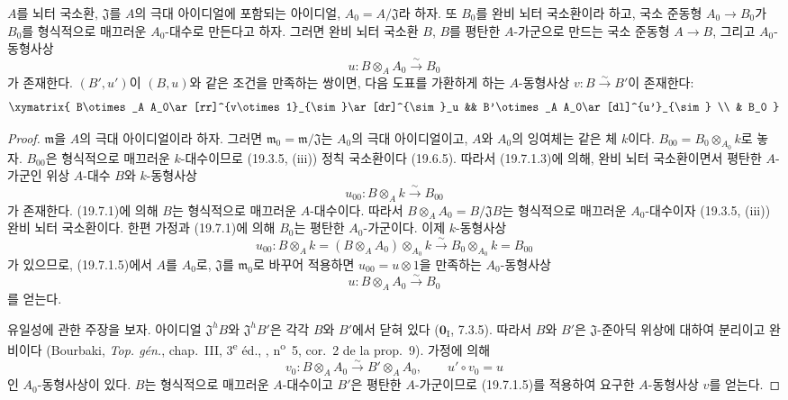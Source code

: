 \begin{theorem}[19.7.2]
\label{0.19.7.2-ko}
$A$를 뇌터 국소환, $\mathfrak J$를 $A$의 극대 아이디얼에 포함되는
아이디얼, $A_0=A/\mathfrak J$라 하자. 또 $B_0$를 완비 뇌터 국소환이라
하고, 국소 준동형 $A_0\to B_0$가 $B_0$를 형식적으로 매끄러운
$A_0$-대수로 만든다고 하자. 그러면 완비 뇌터 국소환 $B$, $B$를
평탄한 $A$-가군으로 만드는 국소 준동형 $A\to B$, 그리고
$A_0$-동형사상
\[
  u:B\otimes_A A_0\xrightarrow{\sim}B_0
\]
가 존재한다. $(B',u')$이 $(B,u)$와 같은 조건을 만족하는 쌍이면,
다음 도표를 가환하게 하는 $A$-동형사상
$v:B\xrightarrow{\sim}B'$이 존재한다:
\[
\xymatrix{
  B\otimes_A A_0\ar[rr]^{v\otimes1}_{\sim}\ar[dr]^{\sim}_u &&
  B'\otimes_A A_0\ar[dl]^{u'}_{\sim} \\
  & B_0
}
\]
\end{theorem}


\begin{proof}
$\mathfrak m$을 $A$의 극대 아이디얼이라 하자. 그러면
$\mathfrak m_0=\mathfrak m/\mathfrak J$는 $A_0$의 극대 아이디얼이고,
$A$와 $A_0$의 잉여체는 같은 체 $k$이다.
$B_{00}=B_0\otimes_{A_0}k$로 놓자. $B_{00}$은 형식적으로 매끄러운
$k$-대수이므로 (19.3.5, (iii)) 정칙 국소환이다 (19.6.5). 따라서
(19.7.1.3)에 의해, 완비 뇌터 국소환이면서 평탄한 $A$-가군인 위상
$A$-대수 $B$와 $k$-동형사상
\[
  u_{00}:B\otimes_A k\xrightarrow{\sim}B_{00}
\]
가 존재한다. (19.7.1)에 의해 $B$는 형식적으로 매끄러운
$A$-대수이다. 따라서
$B\otimes_A A_0=B/\mathfrak JB$는 형식적으로 매끄러운
$A_0$-대수이자 (19.3.5, (iii)) 완비 뇌터 국소환이다. 한편 가정과
(19.7.1)에 의해 $B_0$는 평탄한 $A_0$-가군이다. 이제 $k$-동형사상
\[
  u_{00}:B\otimes_A k
  =(B\otimes_A A_0)\otimes_{A_0}k
  \xrightarrow{\sim}B_0\otimes_{A_0}k=B_{00}
\]
가 있으므로, (19.7.1.5)에서 $A$를 $A_0$로, $\mathfrak J$를
$\mathfrak m_0$로 바꾸어 적용하면
$u_{00}=u\otimes1$을 만족하는 $A_0$-동형사상
\[
  u:B\otimes_A A_0\xrightarrow{\sim}B_0
\]
를 얻는다.

유일성에 관한 주장을 보자. 아이디얼 $\mathfrak J^hB$와
$\mathfrak J^hB'$은 각각 $B$와 $B'$에서 닫혀 있다
($\mathbf 0_{\mathrm I}$, 7.3.5). 따라서 $B$와 $B'$은
$\mathfrak J$-준아딕 위상에 대하여 분리이고 완비이다 (Bourbaki,
\emph{Top. gén.}, chap.~III, 3\textsuperscript{e} éd., ,
n\textsuperscript{o}~5, cor.~2 de la prop.~9). 가정에 의해
\[
  v_0:B\otimes_A A_0\xrightarrow{\sim}B'\otimes_A A_0,
  \qquad u'\circ v_0=u
\]
인 $A_0$-동형사상이 있다. $B$는 형식적으로 매끄러운 $A$-대수이고
$B'$은 평탄한 $A$-가군이므로 (19.7.1.5)를 적용하여 요구한
$A$-동형사상 $v$를 얻는다.
\end{proof}

